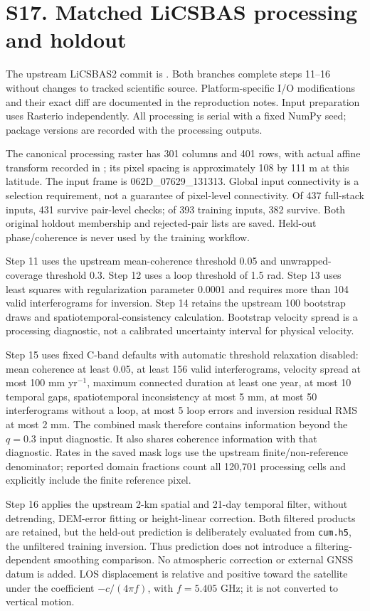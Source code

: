 \documentclass[10pt,a4paper]{article}
\begin{document}
\section*{S17. Matched LiCSBAS processing and holdout}
The upstream LiCSBAS2 commit is . Both branches complete steps 11--16 without changes to tracked scientific source. Platform-specific I/O modifications and their exact diff are documented in the reproduction notes. Input preparation uses Rasterio independently. All processing is serial with a fixed NumPy seed; package versions are recorded with the processing outputs.

The canonical processing raster has 301 columns and 401 rows, with actual affine transform recorded in ; its pixel spacing is approximately 108 by 111 m at this latitude. The input frame is 062D\_07629\_131313. Global input connectivity is a selection requirement, not a guarantee of pixel-level connectivity. Of 437 full-stack inputs, 431 survive pair-level checks; of 393 training inputs, 382 survive. Both original holdout membership and rejected-pair lists are saved. Held-out phase/coherence is never used by the training workflow.

Step 11 uses the upstream mean-coherence threshold 0.05 and unwrapped-coverage threshold 0.3. Step 12 uses a loop threshold of 1.5 rad. Step 13 uses least squares with regularization parameter 0.0001 and requires more than 104 valid interferograms for inversion. Step 14 retains the upstream 100 bootstrap draws and spatiotemporal-consistency calculation. Bootstrap velocity spread is a processing diagnostic, not a calibrated uncertainty interval for physical velocity.

Step 15 uses fixed C-band defaults with automatic threshold relaxation disabled: mean coherence at least 0.05, at least 156 valid interferograms, velocity spread at most 100 mm yr$^{-1}$, maximum connected duration at least one year, at most 10 temporal gaps, spatiotemporal inconsistency at most 5 mm, at most 50 interferograms without a loop, at most 5 loop errors and inversion residual RMS at most 2 mm. The combined mask therefore contains information beyond the $q=0.3$ input diagnostic. It also shares coherence information with that diagnostic. Rates in the saved mask logs use the upstream finite/non-reference denominator; reported domain fractions count all 120,701 processing cells and explicitly include the finite reference pixel.

Step 16 applies the upstream 2-km spatial and 21-day temporal filter, without detrending, DEM-error fitting or height-linear correction. Both filtered products are retained, but the held-out prediction is deliberately evaluated from \texttt{cum.h5}, the unfiltered training inversion. Thus prediction does not introduce a filtering-dependent smoothing comparison. No atmospheric correction or external GNSS datum is added. LOS displacement is relative and positive toward the satellite under the coefficient $-c/(4\pi f)$, with $f=5.405$ GHz; it is not converted to vertical motion.
\end{document}
